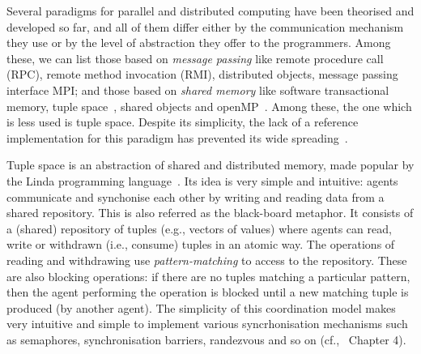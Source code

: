 
Several paradigms for parallel and distributed computing have been theorised and developed so far, and all of them differ either by the communication mechanism they use or by the level of abstraction they offer to the programmers. Among these, we can list those based on \emph{message passing} like remote procedure call (RPC), remote method invocation (RMI), distributed objects, message passing interface MPI; and those based on \emph{shared memory} like software transactional memory, tuple space~\cite{Gelernter85}, shared objects and  openMP~\cite{Mattson03}. Among these, the one which is less used is tuple space. Despite its simplicity, the lack of a reference implementation for this paradigm has prevented its wide spreading~\cite{BuravlevNM18}.


Tuple space is an abstraction of shared and distributed memory, made popular by the Linda programming language~\cite{Gelernter85}. Its idea is very simple and intuitive: agents communicate and synchonise each other by writing and reading data from a shared repository. This is also referred as the black-board metaphor. 
It consists of a (shared) repository of tuples (e.g., vectors of values) where agents can read, write or withdrawn (i.e., consume) tuples in an atomic way. 
The operations of reading and withdrawing use  \emph{pattern-matching} to access to the repository.
 These are also blocking operations:  if there are no tuples matching a particular pattern, then the agent performing the operation is blocked until a new matching tuple is produced (by another agent). The simplicity of this coordination model makes very intuitive and simple to implement various syncrhonisation mechanisms such as semaphores, synchronisation barriers, randezvous and so on (cf.,~\cite{Doberkat00b} Chapter 4).